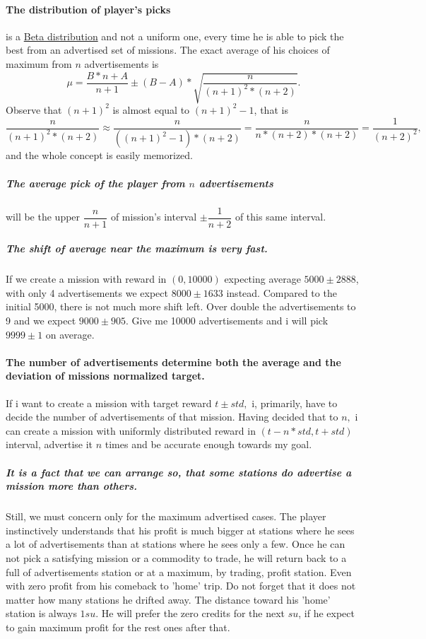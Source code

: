 \documentclass[]{article}
\begin{document}
\paragraph{The distribution of player's picks} is a \hyperref{https://en.wikipedia.org/wiki/Beta_distribution}{category}{name}{Beta distribution} and not a uniform one, every time he is able to pick the best from an advertised set of missions. The exact average of his choices of maximum from $n$ advertisements is \[ \mu=\dfrac{B*n+A}{n+1}\pm (B-A)*\sqrt{\dfrac{n}{(n+1)^2 * (n+2)}}. \]
Observe that $(n+1)^2$ is almost equal to $(n+1)^2-1$, that is \[ \dfrac{n}{(n+1)^2 * (n+2)} \approx \dfrac{n}{((n+1)^2-1) * (n+2)}=\dfrac{n}{n*(n+2) * (n+2)}=\dfrac{1}{(n+2)^2}, \] and  the whole concept is easily memorized. 
\subparagraph{The average pick of the player from $n$ advertisements}  will be the upper $\dfrac{n}{n+1}$ of mission's interval $\pm\dfrac{1}{n+2}$ of this same interval. 
\subparagraph*{The shift of average near the maximum is very fast.} If we create a mission with reward in $(0,10000)$ expecting average $5000\pm2888$, with only 4 advertisements we expect $8000\pm1633$ instead. Compared to the initial 5000, there is not much more shift left. Over double the advertisements to 9 and we expect $9000\pm905$. Give me 10000 advertisements and i will pick $9999\pm1$ on average.  
\paragraph{The number of advertisements determine both the average and the deviation of missions normalized target.} If i want to create a mission with target reward $t\pm std,$ i, primarily, have to decide the number of advertisements of that mission. Having decided that to $n,$ i can create a mission with uniformly distributed reward in $(t-n*std, t+std)$ interval, advertise it $n$ times and be accurate enough towards my goal.
\subparagraph*{It is a fact that we can arrange so, that some stations do advertise a mission more than others.} Still, we must concern only for the maximum advertised cases. The player instinctively understands that his profit is much bigger at stations where he sees a lot of advertisements than at stations where he sees only a few. Once he can not pick a satisfying mission or a commodity to trade, he will return back to a full of advertisements station or at a maximum, by trading, profit station. Even with zero profit from his comeback to 'home' trip. Do not forget that it does not matter how many stations he drifted away. The distance toward his 'home' station is always $1su.$ He will prefer the zero credits for the next $su$, if he expect to gain maximum profit for the rest ones after that.
\end{document}
